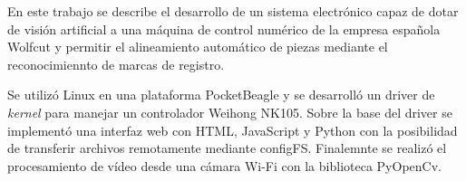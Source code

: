 En este trabajo se describe el desarrollo de un sistema electrónico capaz de dotar de visión artificial a una máquina de control numérico de la empresa española Wolfcut y permitir el alineamiento automático de piezas mediante el reconocimiennto de marcas de registro.\par
Se utilizó Linux en una plataforma PocketBeagle y se desarrolló un driver de \textit{kernel} para manejar un controlador Weihong NK105. Sobre la base del driver se implementó una interfaz web con HTML, JavaScript y Python con la posibilidad de transferir archivos remotamente mediante configFS. Finalemnte se realizó el procesamiento de vídeo desde una cámara Wi-Fi con la biblioteca PyOpenCv.

